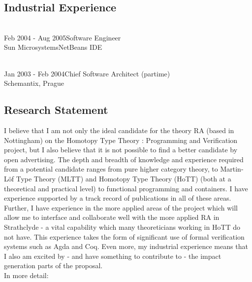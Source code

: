 \documentclass[a4paper]{article}
\newcommand{\project}{Homotopy Type Theory : Programming and Verification}
\newcommand{\mltt}{MLTT}
\begin{document}
\subsection*{Industrial Experience}
\vspace{-1em}
\begin{tabbing}
  \hspace{4cm}\=\\
  Feb 2004 - Aug 2005\>Software Engineer\\
  Sun Microsystems\>NetBeans IDE 
\end{tabbing}
\vspace{-2em}
\begin{tabbing}
\hspace{4cm}\=\\
Jan 2003 - Feb 2004\>Chief Software Architect (partime)\\
Schemantix, Prague
\end{tabbing}


\subsection*{Research Statement}
I believe that I am not only the ideal candidate for the theory RA
(based in Nottingham) on the {\project} project, but I also believe
that it is not possible to find a better candidate by open
advertising. The depth and breadth of knowledge and experience
required from a potential candidate ranges from pure higher category
theory, to Martin-L\"of Type Theory ({\mltt}) and Homotopy Type Theory
(HoTT) (both at a theoretical and practical level) to functional
programming and containers. I have experience supported by a track
record of publications in all of these areas. Further, I have
experience in the more applied areas of the project which will allow me
to interface and collaborate well with the more applied RA in
Strathclyde - a vital capability which many theoreticians working in
HoTT do not have. This experience takes the form of significant use of
formal verification systems such as Agda and Coq. Even more, my
industrial experience means that I also am excited by - and have
something to contribute to - the impact generation parts of the
proposal. \\[1ex]

\noindent In more detail:


\end{document}
